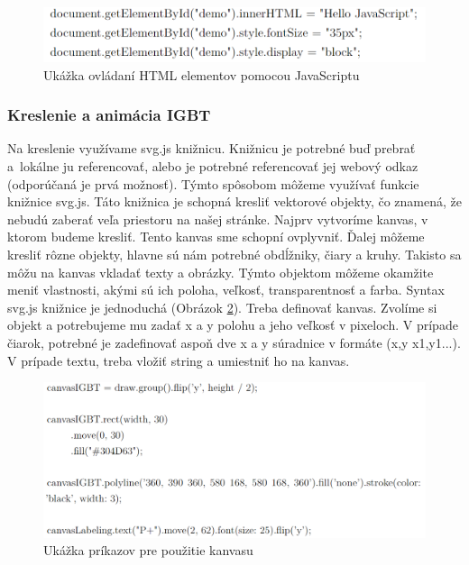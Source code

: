 \newcommand\tab[1][1cm]{\hspace*{#1}}

\begin{figure}[!htbp]
    \centering
    \includegraphics[width=15cm]{img/alg0.PNG}
    \caption{Ukážka ovládaní HTML elementov pomocou JavaScriptu}
    \label{alg0}
\end{figure}

\newpage

\subsubsection{Kreslenie a animácia IGBT}
\noindent Na kreslenie využívame svg.js knižnicu. Knižnicu je potrebné buď  prebrať a lokálne  ju referencovať, alebo je potrebné referencovať jej webový odkaz (odporúčaná je prvá možnosť). Týmto spôsobom môžeme využívať funkcie knižnice svg.js. Táto knižnica je schopná kresliť vektorové objekty, čo znamená, že nebudú zaberať veľa priestoru na našej stránke. Najprv vytvoríme kanvas, v ktorom budeme kresliť. Tento kanvas sme schopní ovplyvniť. Ďalej môžeme kresliť rôzne objekty, hlavne sú nám potrebné obdĺžniky, čiary a kruhy. Takisto sa môžu  na kanvas vkladať texty a obrázky. Týmto objektom môžeme okamžite meniť vlastnosti, akými sú ich poloha, veľkosť, transparentnosť a farba. Syntax svg.js knižnice je jednoduchá (Obrázok \ref{alg1}). Treba definovať kanvas. Zvolíme si objekt a potrebujeme mu zadať x a y polohu a jeho veľkosť v pixeloch. V prípade čiarok, potrebné je zadefinovať aspoň dve x a y súradnice v formáte (x,y x1,y1...). V prípade textu, treba vložiť string a umiestniť ho na kanvas.

\begin{figure}[!htbp]
    \centering
    \includegraphics[width=15cm]{img/alg1.PNG}
    \caption{Ukážka príkazov pre použitie kanvasu}
    \label{alg1}
\end{figure}

